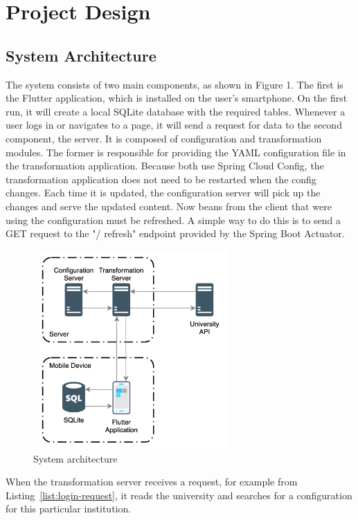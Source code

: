 \chapter{Project Design}
\section{System Architecture}

The system consists of two main components, as shown in Figure 1. The first is the Flutter application, which is installed on the user's smartphone. On the first run, it will create a local SQLite database with the required tables. Whenever a user logs in or navigates to a page, it will send a request for data to the second component, the server. It is composed of configuration and transformation modules. The former is responsible for providing the YAML configuration file in the transformation application. Because both use Spring Cloud Config, the transformation application does not need to be restarted when the config changes. Each time it is updated, the configuration server will pick up the changes and serve the updated content. Now beans from the client that were using the configuration must be refreshed. A simple way to do this is to send a GET request to the "/ refresh" endpoint provided by the Spring Boot Actuator.

\begin{figure}[htb]
    \centering
    \includegraphics[width=0.66\textwidth]{fig03/system_architecture.png}
    \caption{System architecture}
    \label{fig:ux-flow}
\end{figure}

When the transformation server receives a request, for example from Listing~\ref{list:login-request}, it reads the university and searches for a configuration for this particular institution.

